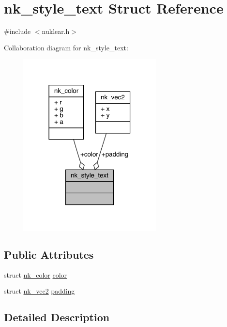 \hypertarget{structnk__style__text}{}\section{nk\+\_\+style\+\_\+text Struct Reference}
\label{structnk__style__text}


{\ttfamily \#include $<$nuklear.\+h$>$}



Collaboration diagram for nk\+\_\+style\+\_\+text\+:
\nopagebreak
\begin{figure}[H]
\begin{center}
\leavevmode
\includegraphics[width=206pt]{structnk__style__text__coll__graph}
\end{center}
\end{figure}
\subsection*{Public Attributes}
\begin{DoxyCompactItemize}
\item 
struct \mbox{\hyperlink{structnk__color}{nk\+\_\+color}} \mbox{\hyperlink{structnk__style__text_a21064eb801febacffa14146f95ca7d74}{color}}
\item 
struct \mbox{\hyperlink{structnk__vec2}{nk\+\_\+vec2}} \mbox{\hyperlink{structnk__style__text_a1939fda3b4e6295ec5645394a4fbc538}{padding}}
\end{DoxyCompactItemize}


\subsection{Detailed Description}


